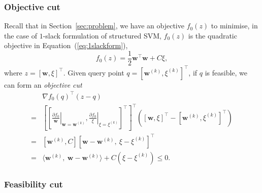 \documentclass[9pt]{extarticle}
\begin{document}
\subsubsection{Objective cut}
\label{sec:ssvm_objcut}

Recall that in Section~\ref{sec:problem}, we have an objective $f_0(z)$ to minimise, in the case of $1$-slack formulation of structured SVM,
$f_0(z)$ is the quadratic objective in Equation~(\ref{eq:1slackform}), 
\begin{equation}
\label{eq:optobj}
f_0(z) = \frac{1}{2} \mathbf{w}^\top \mathbf{w} + C\xi,
\end{equation}
where $z = [\mathbf{w}, \xi]^\top$.
Given query point $q = \left[ \mathbf{w}^{(k)}, \xi^{(k)} \right]^\top$, if $q$ is feasible, we can form an \emph{objective cut}
\begin{equation}
\label{eq:objcut_ssvm}
\begin{aligned}
 & \nabla f_0(q)^\top (z - q) \\
=& \left[ \left[ \left.\frac{\partial f_0}{\mathbf{w}}\right|_{\mathbf{w} = \mathbf{w}^{(k)}}, 
                 \left.\frac{\partial f_0}{\xi}\right|_{\xi = \xi^{(k)}} \right]^\top \right]^\top 
   \left( \left[ \mathbf{w}, \xi \right]^\top - \left[ \mathbf{w}^{(k)}, \xi^{(k)} \right]^\top \right)  \\
=& \left[ \mathbf{w}^{(k)}, C \right] \left[ \mathbf{w} - \mathbf{w}^{(k)},~ \xi - \xi^{(k)} \right]^\top  \\
=& \langle \mathbf{w}^{(k)},~ \mathbf{w} - \mathbf{w}^{(k)} \rangle + C (\xi - \xi^{(k)}) \le 0.
\end{aligned}
\end{equation}


\subsubsection{Feasibility cut}
\label{sec:ssvm_feacut}
\end{document}
